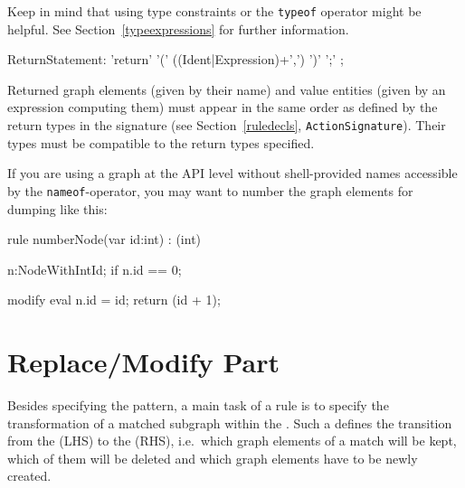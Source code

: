 Keep in mind that using type constraints or the \texttt{typeof} operator might be helpful. See Section~\ref{typeexpressions} for further information.


\begin{rail}
  ReturnStatement: 'return' '(' ((Ident|Expression)+',') ')' ';' ;
\end{rail}
Returned graph elements (given by their name) and value entities (given by an expression computing them) must appear in the same order as defined by the return types in the signature (see Section~\ref{ruledecls}, \texttt{ActionSignature}).
Their types must be compatible to the return types specified.

\begin{note}
If you are using a graph at the API level without shell-provided names accessible by the \texttt{nameof}-operator, you may want to number the graph elements for dumping like this:
\begin{grgen}
rule numberNode(var id:int) : (int)
{
  n:NodeWithIntId;
  if { n.id == 0; }
  
  modify {
    eval {
      n.id = id;
    }
    return (id + 1);
  }
}
\end{grgen}
\end{note} 


\section{Replace/Modify Part}
\label{sec:replacemodify}
Besides specifying the pattern, a main task of a rule is to specify the transformation of a matched subgraph within the . 
Such a  defines the transition from the  (LHS) to the  (RHS), i.e.\ which graph elements of a match will be kept, which of them will be deleted and which graph elements have to be newly created.

